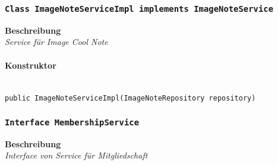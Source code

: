      \subsubsection{\texttt{Class ImageNoteServiceImpl implements ImageNoteService}}
     \textbf{Beschreibung} \\
     \textit{Service für Image Cool Note}
     \paragraph*{Konstruktor}\mbox{} \\
     \texttt{public ImageNoteServiceImpl(ImageNoteRepository repository)} \\
     \subsubsection{\texttt{Interface MembershipService}}
     \textbf{Beschreibung} \\
     \textit{Interface von Service für Mitgliedschaft}
